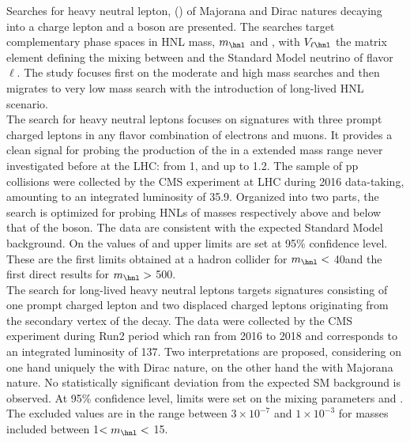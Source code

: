 
\begin{extraAbstract}

Searches for heavy neutral lepton, (\hnl) of Majorana and Dirac natures
decaying into a charge lepton and a \PW boson are presented.
The searches target complementary phase spaces in HNL mass, $m_\hnl$
and \mixpar, with $V_{\ell \hnl}$ the matrix element
defining the mixing between \hnl and the Standard Model neutrino of flavor $\ell$.
The study focuses first on the
moderate and high mass searches and then migrates to very low mass search with
the introduction of long-lived HNL scenario.\\

The search for heavy neutral leptons focuses on signatures with three
prompt charged leptons in any flavor combination of electrons and
muons. It provides a clean signal for probing the production of the
\hnl in a extended mass range never investigated before at the LHC:
from 1\GeV, and up to 1.2\TeV. The sample of pp collisions were
collected by the CMS experiment at LHC during 2016 data-taking, amounting to
an integrated luminosity of 35.9\fbinv. 
Organized into two parts, the search is optimized for
probing HNLs of masses respectively above and below that of the \PW boson. 
The data are consistent with the expected Standard Model
background. On the values of \mixparm and \mixpare upper limits are
set at 95\% confidence level. 
These are the first limits obtained at a hadron collider for
 $m_\hnl <$ 40\GeV and the first direct results for $m_\hnl >$
 500\GeV.\\

The search for long-lived heavy neutral leptons targets signatures
consisting of one prompt charged lepton and two displaced
charged leptons originating from the secondary vertex of the \hnl decay.
The data were collected by the
CMS experiment during Run2 period which ran from 2016 to 2018 and corresponds to an integrated
luminosity of 137\fbinv. Two interpretations are proposed, considering
on one hand uniquely the \hnl with 
Dirac nature, on the other hand the \hnl with Majorana nature. 
No statistically significant deviation from the expected
SM background is observed. At 95\% confidence level, limits were set on the mixing
parameters \mixpare and \mixparm. The excluded values are in the
range between $3\times 10^{-7}$ and $1\times 10^{-3}$ for masses included
between 1\GeV $< m_\hnl <$ 15\GeV. 
























\end{extraAbstract}
